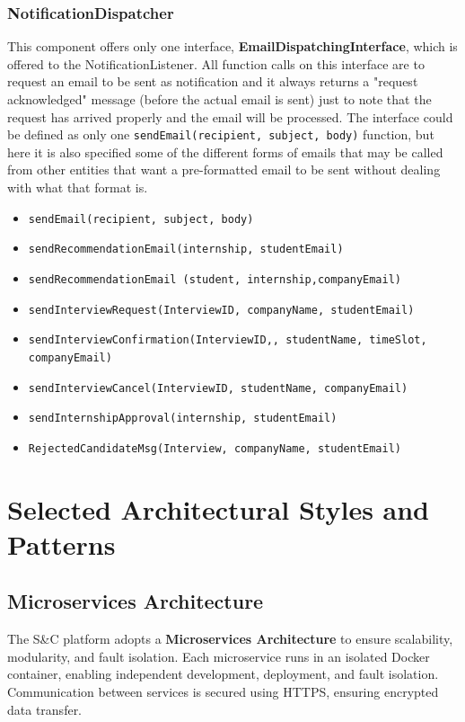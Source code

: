 \subsubsection{NotificationDispatcher}
This component offers only one interface, \textbf{EmailDispatchingInterface}, which is offered to the NotificationListener. All function calls on this interface are to request an email to be sent as notification and it always returns a "request acknowledged" message (before the actual email is sent) just to note that the request has arrived properly and the email will be processed. The interface could be defined as only one \texttt{sendEmail(recipient, subject, body)} function, but here it is also specified some of the different forms of emails that may be called from other entities that want a pre-formatted email to be sent without dealing with what that format is.
\begin{itemize}
    \item \texttt{sendEmail(recipient, subject, body)}
    \item \texttt{sendRecommendationEmail(internship,
studentEmail)}
    \item \texttt{sendRecommendationEmail
(student, internship,companyEmail)}
    \item \texttt{sendInterviewRequest(InterviewID,
companyName, studentEmail)}
    \item \texttt{sendInterviewConfirmation(InterviewID,, studentName, timeSlot, companyEmail)}
    \item \texttt{sendInterviewCancel(InterviewID,
 studentName, companyEmail)}
    \item \texttt{sendInternshipApproval(internship,
studentEmail)}
    \item \texttt{RejectedCandidateMsg(Interview,
companyName, studentEmail)}
\end{itemize}


\section{Selected Architectural Styles and Patterns}
\subsection{Microservices Architecture}
The S\&C platform adopts a \textbf{Microservices Architecture} to ensure scalability, modularity, and fault isolation. Each microservice runs in an isolated Docker container, enabling independent development, deployment, and fault isolation. Communication between services is secured using HTTPS, ensuring encrypted data transfer.

